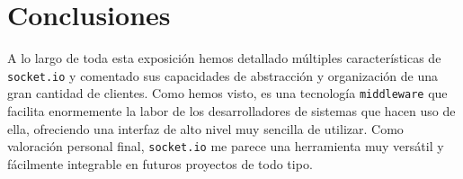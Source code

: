 \documentclass[runningheads]{llncs}
\begin{document}
\section{Conclusiones}

A lo largo de toda esta exposición hemos detallado múltiples características de \texttt{socket.io} y comentado sus capacidades de abstracción y organización de una gran cantidad de clientes.
Como hemos visto, es una tecnología \texttt{middleware} que facilita enormemente la labor de los desarrolladores de sistemas que hacen uso de ella, ofreciendo una interfaz de alto nivel muy sencilla de utilizar.
Como valoración personal final, \texttt{socket.io} me parece una herramienta muy versátil y fácilmente integrable en futuros proyectos de todo tipo.

\vfill
\pagebreak
\end{document}
